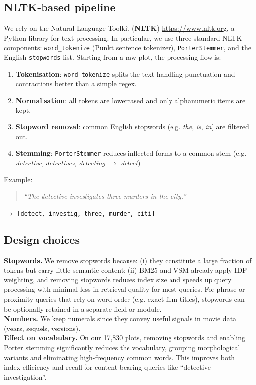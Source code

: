 \documentclass[11pt,a4paper]{article}
\begin{document}
\subsection{NLTK-based pipeline}

We rely on the Natural Language Toolkit (\textbf{NLTK}) {\url{https://www.nltk.org}}, a Python library for text processing. In particular, we use three standard NLTK components: \texttt{word\_tokenize} (Punkt sentence tokenizer), \texttt{PorterStemmer}, and the English \texttt{stopwords} list. Starting from a raw plot, the processing flow is:

\begin{enumerate}
    \item \textbf{Tokenisation}: \texttt{word\_tokenize} splits the text handling punctuation and contractions better than a simple regex.
    \item \textbf{Normalisation}: all tokens are lowercased and only alphanumeric items are kept.
    \item \textbf{Stopword removal}: common English stopwords (e.g. \textit{the}, \textit{is}, \textit{in}) are filtered out.
    \item \textbf{Stemming}: \texttt{PorterStemmer} reduces inflected forms to a common stem (e.g. \textit{detective}, \textit{detectives}, \textit{detecting} $\rightarrow$ \textit{detect}).
\end{enumerate}

Example:
\begin{quote}
\textit{``The detective investigates three murders in the city.''}
\end{quote}
$\rightarrow$ \texttt{[detect, investig, three, murder, citi]}

\subsection{Design choices}

\textbf{Stopwords.} We remove stopwords because: (i) they constitute a large fraction of tokens but carry little semantic content; (ii) BM25 and VSM already apply IDF weighting, and removing stopwords reduces index size and speeds up query processing with minimal loss in retrieval quality for most queries. For phrase or proximity queries that rely on word order (e.g. exact film titles), stopwords can be optionally retained in a separate field or module.
\\
\textbf{Numbers.} We keep numerals since they convey useful signals in movie data (years, sequels, versions).
\\
\textbf{Effect on vocabulary.} On our 17{,}830 plots, removing stopwords and enabling Porter stemming significantly reduces the vocabulary, grouping morphological variants and eliminating high-frequency common words. This improves both index efficiency and recall for content-bearing queries like ``detective investigation''.
\end{document}
